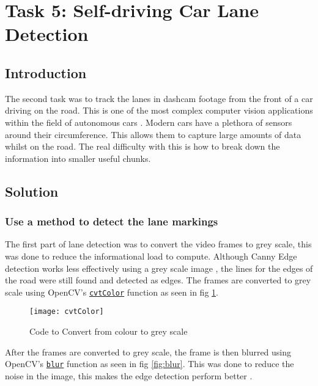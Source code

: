 \documentclass[conference]{IEEEtran}
\begin{document}
\section{Task 5: Self-driving Car Lane Detection}
\subsection{Introduction}

The second task was to track the lanes in dashcam footage from the front of a car driving on the road. This is one of the most complex computer vision applications within the field of autonomous cars \cite{Hajare2016AVB}. Modern cars have a plethora of sensors around their circumference. This allows them to capture large amounts of data whilst on the road. The real difficulty with this is how to break down the information into smaller useful chunks.  

\subsection{Solution}

\subsubsection{Use a method to detect the lane markings}

The first part of lane detection was to convert the video frames to grey scale, this was done to reduce the informational load to compute. Although Canny Edge detection works less effectively using a grey scale image \cite{Canny_On_Grey}, the lines for the edges of the road were still found and detected as edges. The frames are converted to grey scale using OpenCV's \href{https://docs.opencv.org/4.x/d8/d01/group__imgproc__color__conversions.html#ga397ae87e1288a81d2363b61574eb8cab}{\texttt{cvtColor}} function as seen in fig \ref{fig:cvtColor}.

\begin{figure}[H]
\centerline{\texttt{[image: cvtColor]}}
\caption{Code to Convert from colour to grey scale}
\label{fig:cvtColor}
\end{figure}

After the frames are converted to grey scale, the frame is then blurred using OpenCV's \href{https://docs.opencv.org/4.x/d4/d86/group__imgproc__filter.html#ga8c45db9afe636703801b0b2e440fce37}{\texttt{blur}} function as seen in fig \ref{fig:blur}. This was done to reduce the noise in the image, this makes the edge detection perform better \cite{Image_Blurring}.
\end{document}
